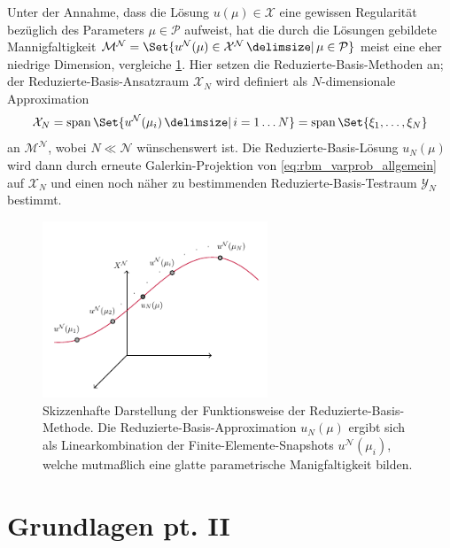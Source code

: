 \documentclass[../main.tex]{subfiles}
\begin{document}
Unter der Annahme, dass die Lösung $u(\mu) \in \mathcal X$ eine gewissen Regularität bezüglich des Parameters $\mu \in \mathcal P$ aufweist, hat die durch die Lösungen gebildete Mannigfaltigkeit $\mathcal M^{\mathcal N} = \Set{u^{\mathcal N}(\mu) \in \mathcal X^{\mathcal N} \given \mu \in \mathcal P}$ meist eine eher niedrige Dimension, vergleiche \cref{fig:figure1}.
Hier setzen die Reduzierte-Basis-Methoden an; der Reduzierte-Basis-Ansatzraum $\mathcal X_{N}$ wird definiert als $N$-dimensionale Approximation
\begin{equation}
    \mathcal X_{N} = \spn\Set{u^{\mathcal N}(\mu_{i}) \given i = 1 \dots N} = \spn\Set{\xi_{1}, \dots, \xi_{N}}
\end{equation}
an $\mathcal M^{\mathcal N}$, wobei $N \ll \mathcal N$ wünschenswert ist.
Die Reduzierte-Basis-Lösung $u_{N}(\mu)$ wird dann durch erneute Galerkin-Projektion von \cref{eq:rbm_varprob_allgemein} auf $\mathcal X_{N}$ und einen noch näher zu bestimmenden Reduzierte-Basis-Testraum $\mathcal Y_{N}$ bestimmt.

\begin{figure}[tb]
    \centering
    \includegraphics[width=0.6\textwidth]{figures/rb.pdf}
    \caption[%
    Skizze zur Motivation der Reduzierte-Basis-Methode.
    ]{
        Skizzenhafte Darstellung der Funktionsweise der Reduzierte-Basis-Methode.
        Die Reduzierte-Basis-Approximation $u_{N}(\mu)$ ergibt sich als Linearkombination der Finite-Elemente-Snapshots $u^{\mathcal N}(\mu_{i})$, welche mutmaßlich eine glatte parametrische Manigfaltigkeit bilden.
        }
    \label{fig:figure1}
\end{figure}


\section{Grundlagen pt. II} %
\label{sec:grundlagen}
\end{document}
